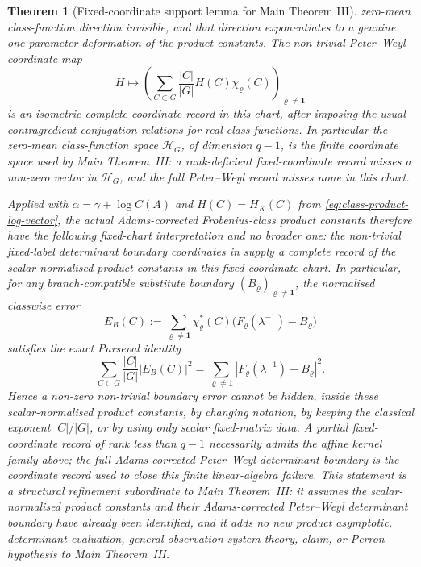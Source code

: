 \documentclass[11pt,a4paper]{amsart}
\theoremstyle{plain}
\newtheorem{theorem}{Theorem}[section]
\theoremstyle{definition}
\theoremstyle{remark}
\begin{document}
\begin{theorem}[Fixed-coordinate support lemma for Main Theorem III]
  zero-mean class-function direction invisible, and that direction exponentiates
  to a genuine one-parameter deformation of the product constants.  The
  non-trivial Peter--Weyl coordinate map
  \begin{equation}\label{eq:fixed-coordinate-support-peter-weyl-record}
    H\longmapsto
    \left(
      \sum_{C\subset G}\frac{|C|}{|G|}H(C)\chi_\varrho(C)
    \right)_{\varrho\ne\mathbf1}
  \end{equation}
  is an isometric complete coordinate record in this chart, after
  imposing the usual contragredient conjugation relations for real class
  functions.  In particular the zero-mean class-function space
  \(\mathcal H_G\), of dimension \(q-1\), is the finite coordinate space used
  by Main Theorem~III: a rank-deficient fixed-coordinate record misses a
  non-zero vector in \(\mathcal H_G\), and the full Peter--Weyl record misses
  none in this chart.

  Applied with \(\alpha=\gamma+\log C(A)\) and
  \(H(C)=H_K(C)\) from \eqref{eq:class-product-log-vector}, the actual
  Adams-corrected Frobenius-class product constants therefore have the
  following fixed-chart interpretation and no broader one: the non-trivial
  fixed-label determinant boundary coordinates in
   supply a complete
  record of the scalar-normalised product constants in this fixed coordinate
  chart.  In particular, for
  any branch-compatible substitute boundary
  \((B_\varrho)_{\varrho\ne\mathbf1}\), the normalised classwise error
  \[
    E_B(C):=
    \sum_{\varrho\ne\mathbf1}\chi_\varrho^\ast(C)
      \bigl(F_\varrho(\lambda^{-1})-B_\varrho\bigr)
  \]
  satisfies the exact Parseval identity
  \begin{equation}\label{eq:fixed-coordinate-support-error-bound}
    \sum_{C\subset G}\frac{|C|}{|G|}|E_B(C)|^2
    =
    \sum_{\varrho\ne\mathbf1}
      |F_\varrho(\lambda^{-1})-B_\varrho|^2.
  \end{equation}
  Hence a non-zero non-trivial boundary error cannot be hidden, inside these
  scalar-normalised product constants, by changing notation, by keeping the
  classical exponent \(|C|/|G|\), or by using only scalar fixed-matrix data.  A
  partial fixed-coordinate record of rank less than \(q-1\) necessarily admits
  the affine kernel family above; the full Adams-corrected Peter--Weyl
  determinant boundary is the coordinate record used to close this finite
  linear-algebra failure.  This statement is a structural refinement
  subordinate to Main Theorem~III:
  it assumes the scalar-normalised product constants and their Adams-corrected
  Peter--Weyl determinant boundary have already been identified, and it adds no
  new product asymptotic, determinant evaluation, general observation-system
  theory,
  claim, or Perron hypothesis to Main Theorem~III.
\end{theorem}
\end{document}
